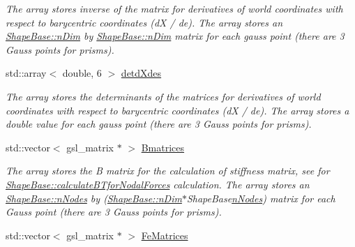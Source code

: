 \begin{DoxyCompactItemize}
\begin{DoxyCompactList}\small\item\em The array stores inverse of the matrix for derivatives of world coordinates with respect to barycentric coordinates (d\+X / de). The array stores an \hyperlink{classShapeBase_a0ae4246d158f4d66b5bd1644df40f150}{Shape\+Base\+::n\+Dim} by \hyperlink{classShapeBase_a0ae4246d158f4d66b5bd1644df40f150}{Shape\+Base\+::n\+Dim} matrix for each gauss point (there are 3 Gauss points for prisms). \end{DoxyCompactList}\item 
\hypertarget{classShapeBase_a37f25110de54965266cb29b66eaf5b81}{}std\+::array$<$ double, 6 $>$ \hyperlink{classShapeBase_a37f25110de54965266cb29b66eaf5b81}{detd\+Xdes}\label{classShapeBase_a37f25110de54965266cb29b66eaf5b81}

\begin{DoxyCompactList}\small\item\em The array stores the determinants of the matrices for derivatives of world coordinates with respect to barycentric coordinates (d\+X / de). The array stores a double value for each gauss point (there are 3 Gauss points for prisms). \end{DoxyCompactList}\item 
\hypertarget{classShapeBase_a04079b2f81481d44a9b3efb8916c8423}{}std\+::vector$<$ gsl\+\_\+matrix $\ast$ $>$ \hyperlink{classShapeBase_a04079b2f81481d44a9b3efb8916c8423}{Bmatrices}\label{classShapeBase_a04079b2f81481d44a9b3efb8916c8423}

\begin{DoxyCompactList}\small\item\em The array stores the B matrix for the calculation of stiffness matrix, see for \hyperlink{classShapeBase_ad67919694a1d780e31f6d539781377be}{Shape\+Base\+::calculate\+B\+Tfor\+Nodal\+Forces} calculation. The array stores an \hyperlink{classShapeBase_a0daa5629b1335ca3e1be089a006fe897}{Shape\+Base\+::n\+Nodes} by (\hyperlink{classShapeBase_a0ae4246d158f4d66b5bd1644df40f150}{Shape\+Base\+::n\+Dim}$\ast$\+Shape\+Base\hyperlink{classShapeBase_a0daa5629b1335ca3e1be089a006fe897}{n\+Nodes}) matrix for each Gauss point (there are 3 Gauss points for prisms). \end{DoxyCompactList}\item 
\hypertarget{classShapeBase_aae6b0d0bc99f2c07986522fd866312ea}{}std\+::vector$<$ gsl\+\_\+matrix $\ast$ $>$ \hyperlink{classShapeBase_aae6b0d0bc99f2c07986522fd866312ea}{Fe\+Matrices}\label{classShapeBase_aae6b0d0bc99f2c07986522fd866312ea}


\end{DoxyCompactItemize}
